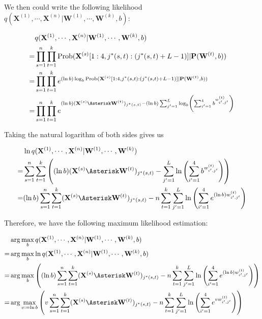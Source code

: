\documentclass[12pt]{article}
\newcommand{\matrixSymbol}[1]{\mathbf{#1}}
\begin{document}
We then could write the following likelihood $q(\matrixSymbol{X}^{(1)}, \cdots, \matrixSymbol{X}^{(n)} | \matrixSymbol{W}^{(1)}, \cdots, \matrixSymbol{W}^{(k)}, b )$:

\begin{align}
 & q(\matrixSymbol{X}^{(1)}, \cdots, \matrixSymbol{X}^{(n)} | \matrixSymbol{W}^{(1)}, \cdots, \matrixSymbol{W}^{(k)}, b )  \notag \\
= & \prod_{s=1}^{n}\prod_{t=1}^{k}\mathrm{Prob}(\matrixSymbol{X}^{(s)}[1:4, j^*(s, t):(j^*(s, t)+L-1)]|\matrixSymbol{P}(\matrixSymbol{W}^{(t)}, b)) \\
= & \prod_{s=1}^{n}\prod_{t=1}^{k}e^{(\ln b) \log_b{\mathrm{Prob}(\matrixSymbol{X}^{(s)}[1:4, j^*(s, t):(j^*(s, t)+L-1)]|\matrixSymbol{P}(\matrixSymbol{W}^{(t)}, b))}} \notag \\
= & \prod_{s=1}^{n}\prod_{t=1}^{k}e^{(\ln b) (\matrixSymbol{X}^{(s)} \Asterisk \matrixSymbol{W}^{(t)})_{j^*(s, t)} - (\ln b) \sum_{j'=1}^{L}{\log_{b} \left( \sum_{i'=1}^{4}{b^{w^{(t)}_{i', j'}} } \right)}} \notag 
\end{align}

Taking the natural logarithm of both sides gives us

\begin{align}
 & \ln q(\matrixSymbol{X}^{(1)}, \cdots, \matrixSymbol{X}^{(n)} | \matrixSymbol{W}^{(1)}, \cdots, \matrixSymbol{W}^{(k)} ) \notag \\
= & \sum_{s=1}^{n}\sum_{t=1}^{k}\left( (\ln b) (\matrixSymbol{X}^{(s)} \Asterisk \matrixSymbol{W}^{(t)})_{j^*(s, t)} - \sum_{j'=1}^{L}{\ln \left( \sum_{i'=1}^{4}{b^{w^{(t)}_{i', j'}} } \right)} \right) \\
= & (\ln b)\sum_{s=1}^{n}\sum_{t=1}^{k}  (\matrixSymbol{X}^{(s)} \Asterisk \matrixSymbol{W}^{(t)})_{j^*(s, t)} - n\sum_{t=1}^{k}\sum_{j'=1}^{L}{\ln \left( \sum_{i'=1}^{4}{e^{(\ln b)w^{(t)}_{i', j'}} } \right)} \notag 
\end{align}

Therefore, we have the following maximum likelihood estimation:

\begin{align}
& \arg\max_bq( \matrixSymbol{X}^{(1)}, \cdots, \matrixSymbol{X}^{(n)} | \matrixSymbol{W}^{(1)}, \cdots, \matrixSymbol{W}^{(k)}, b ) \notag \\
= &  \arg\max_b \ln q(\matrixSymbol{X}^{(1)}, \cdots, \matrixSymbol{X}^{(n)} | \matrixSymbol{W}^{(1)}, \cdots, \matrixSymbol{W}^{(k)}, b ) \\
= & \arg\max_b \left( (\ln b) \sum_{s=1}^{n}\sum_{t=1}^{k} (\matrixSymbol{X}^{(s)} \Asterisk \matrixSymbol{W}^{(t)})_{j^*(s, t)} - n\sum_{t=1}^{k}\sum_{j'=1}^{L}{\ln \left( \sum_{i'=1}^{4}{e^{(\ln b)  w^{(t)}_{i', j'}} } \right)} \right) \notag \\
= & \arg\max_{v:=\ln b}\left( v \sum_{s=1}^{n}\sum_{t=1}^{k}   (\matrixSymbol{X}^{(s)} \Asterisk \matrixSymbol{W}^{(t)})_{j^*(s, t)} - n\sum_{t=1}^{k}\sum_{j'=1}^{L}{\ln \left( \sum_{i'=1}^{4}{e^{v  w^{(t)}_{i', j'}} } \right)} \right) \notag
\end{align}
\end{document}

